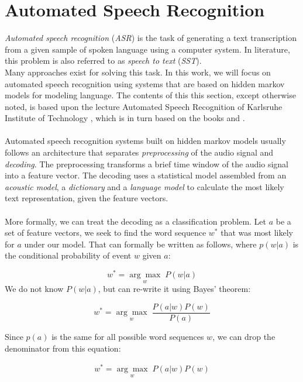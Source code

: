 

\section{Automated Speech Recognition}
\label{ch:HMM_ASR}
\textit{Automated speech recognition} (\textit{ASR}) is the task of generating a text transcription from a given sample of spoken language using a computer system. In literature, this problem is also referred to as \textit{speech to text} (\textit{SST}). \\
Many approaches exist for solving this task. In this work, we will focus on automated speech recognition using systems that are based on hidden markov models for modeling language. The contents of this this section, except otherwise noted, is based upon the lecture Automated Speech Recognition of Karlsruhe Institute of Technology \cite{kitasr2018stueker}, which is in turn based on the books \cite{schukat1995automatische} and \cite{huang2001spoken}. \\ \\
Automated speech recognition systems built on hidden markov models usually follows an architecture that separates \textit{preprocessing} of the audio signal and \textit{decoding}. The preprocessing transforms a brief time window of the audio signal into a feature vector. The decoding uses a statistical model assembled from an \textit{acoustic model}, a \textit{dictionary} and a \textit{language model} to calculate the most likely text representation, given the feature vectors.\\ \\

More formally, we can treat the decoding as a classification problem. Let $a$ be a set of feature vectors, we seek to find the word sequence $w^*$ that was most likely for $a$ under our model. That can formally be written as follows, where $p(w|a)$ is the conditional probability of event $w$ given $a$:

\[
w^* = \underset{w}{\arg \max} \; P(w|a)
\] 
We do not know $P(w|a)$, but can re-write it using Bayes' theorem:

\[
w^* = \underset{w}{\arg \max} \; \frac{P(a|w) P(w)}{P(a)}
\]

Since $p(a)$ is the same for all possible word sequences $w$, we can drop the denominator from this equation:

\begin{align}
w^* = \underset{w}{\arg \max} \; P(a|w) P(w)
\label{eq:asr_base_formula}
\end{align}

